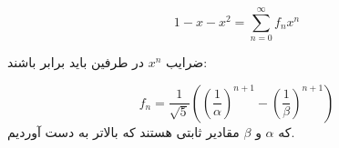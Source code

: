\begin{PROBLEM}
\begin{enumerate}
{                    
                    $$1 - x - x^2 = \sum_{n = 0}^{\infty} f_nx^n$$
                    
                    ضرایب $x^n$ در طرفین باید برابر باشند:
                    

                    $$f_n = \frac{1}{\sqrt{5}}( (\frac{1}{\alpha})^{n + 1} - (\frac{1}{\beta})^{n + 1}   )$$
                    که 
                    $\alpha$
                    و 
                    $\beta$
                    مقادیر ثابتی هستند که بالاتر به دست آوردیم.

            }
    \end{enumerate}


  
\end{PROBLEM}